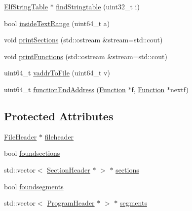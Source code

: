 \begin{DoxyCompactItemize}
\item 
\hyperlink{class_e_p_a_x_1_1_elf_1_1_elf_string_table}{\-Elf\-String\-Table} $\ast$ \hyperlink{class_e_p_a_x_1_1_elf_1_1_elf_binary_ae14d70c8ea2a3e9eaa1be65661c56efb}{find\-Stringtable} (uint32\-\_\-t i)
\item 
bool \hyperlink{class_e_p_a_x_1_1_elf_1_1_elf_binary_ae52abd95dd6d7f77d3e6da0e629c86e5}{inside\-Text\-Range} (uint64\-\_\-t a)
\item 
void \hyperlink{class_e_p_a_x_1_1_elf_1_1_elf_binary_ae200e871cf5c040ed1d8ed074eb1e5c2}{print\-Sections} (std\-::ostream \&stream=std\-::cout)
\item 
void \hyperlink{class_e_p_a_x_1_1_elf_1_1_elf_binary_aac1eb1e8571502f6005ac54d4b6e5920}{print\-Functions} (std\-::ostream \&stream=std\-::cout)
\item 
uint64\-\_\-t \hyperlink{class_e_p_a_x_1_1_elf_1_1_elf_binary_add93e2899e35ec753660479b1aa6969f}{vaddr\-To\-File} (uint64\-\_\-t v)
\item 
uint64\-\_\-t \hyperlink{class_e_p_a_x_1_1_elf_1_1_elf_binary_a7cba4b5796d98043e281f46437abb6d9}{function\-End\-Address} (\hyperlink{class_e_p_a_x_1_1_function}{\-Function} $\ast$f, \hyperlink{class_e_p_a_x_1_1_function}{\-Function} $\ast$nextf)
\end{DoxyCompactItemize}
\subsection*{\-Protected \-Attributes}
\begin{DoxyCompactItemize}
\item 
\hyperlink{class_e_p_a_x_1_1_elf_1_1_file_header}{\-File\-Header} $\ast$ \hyperlink{class_e_p_a_x_1_1_elf_1_1_elf_binary_aa0f3e41ca81ccff7704a1a25d2ec3a45}{fileheader}
\item 
bool \hyperlink{class_e_p_a_x_1_1_elf_1_1_elf_binary_a0fff68c4ab05d176acf716fc878a20ab}{foundsections}
\item 
std\-::vector$<$ \hyperlink{class_e_p_a_x_1_1_elf_1_1_section_header}{\-Section\-Header} $\ast$ $>$ $\ast$ \hyperlink{class_e_p_a_x_1_1_elf_1_1_elf_binary_afbb96059b56ec958d3901a1562343224}{sections}
\item 
bool \hyperlink{class_e_p_a_x_1_1_elf_1_1_elf_binary_a07d9f4abb56b2522a17f6db39373a53a}{foundsegments}
\item 
std\-::vector$<$ \hyperlink{class_e_p_a_x_1_1_elf_1_1_program_header}{\-Program\-Header} $\ast$ $>$ $\ast$ \hyperlink{class_e_p_a_x_1_1_elf_1_1_elf_binary_a75dbde6b29cdcd5297e18645c165d7d5}{segments}
\end{DoxyCompactItemize}


